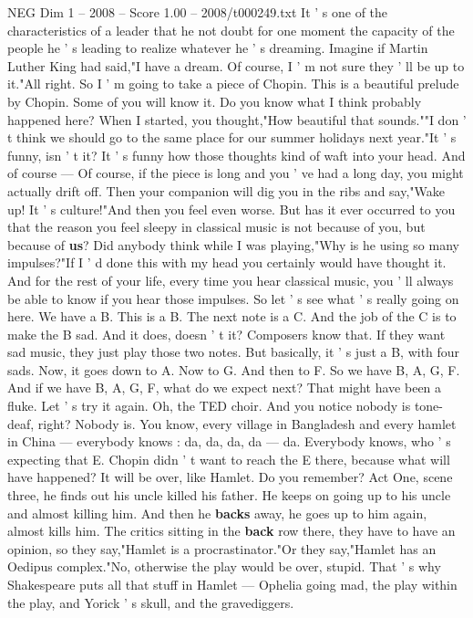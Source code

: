 \begin{textsample}{NEG Dim 1 – 2008 – Score 1.00 – 2008/t000249.txt}
It ' s one of the characteristics of a leader that he not doubt for one moment the capacity of the people he ' s leading to realize whatever he ' s dreaming.
Imagine if Martin Luther King had said,"I have a dream.
Of course, I ' m not sure they ' ll be up to it."All right.
So I ' m going to take a piece of Chopin.
This is a beautiful prelude by Chopin.
Some of you will know it.
Do you know what I think probably happened here?
When I started, you thought,"How beautiful that sounds.""I don ' t think we should go to the same place for our summer holidays next year."It ' s funny, isn ' t it?
It ' s funny how those thoughts kind of waft into your head.
And of course — Of course, if the piece is long and you ' ve had a long day, you might actually drift off.
Then your companion will dig you in the ribs and say,"Wake up!
It ' s culture!"And then you feel even worse.
But has it ever occurred to you that the reason you feel sleepy in classical music is not because of you, but because of \textbf{us}?
Did anybody think while I was playing,"Why is he using so many impulses?"If I ' d done this with my head you certainly would have thought it.
And for the rest of your life, every time you hear classical music, you ' ll always be able to know if you hear those impulses.
So let ' s see what ' s really going on here.
We have a B.
This is a B.
The next note is a C.
And the job of the C is to make the B sad.
And it does, doesn ' t it?
Composers know that.
If they want sad music, they just play those two notes.
But basically, it ' s just a B, with four sads.
Now, it goes down to A.
Now to G.
And then to F.
So we have B, A, G, F.
And if we have B, A, G, F, what do we expect next?
That might have been a fluke.
Let ' s try it again.
Oh, the TED choir.
And you notice nobody is tone-deaf, right?
Nobody is.
You know, every village in Bangladesh and every hamlet in China — everybody knows : da, da, da, da — da.
Everybody knows, who ' s expecting that E.
Chopin didn ' t want to reach the E there, because what will have happened?
It will be over, like Hamlet.
Do you remember?
Act One, scene three, he finds out his uncle killed his father.
He keeps on going up to his uncle and almost killing him.
And then he \textbf{backs} away, he goes up to him again, almost kills him.
The critics sitting in the \textbf{back} row there, they have to have an opinion, so they say,"Hamlet is a procrastinator."Or they say,"Hamlet has an Oedipus complex."No, otherwise the play would be over, stupid.
That ' s why Shakespeare puts all that stuff in Hamlet — Ophelia going mad, the play within the play, and Yorick ' s skull, and the gravediggers.

\end{textsample}
